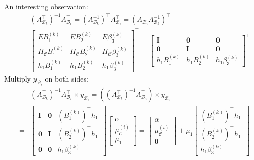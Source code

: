 \documentclass[letterpaper, 11pt]{article}
\theoremstyle{plain}
\theoremstyle{definition}
\begin{document}
An interesting observation:
\begin{eqnarray}
  & & (A_{\mathcal{B}_k}^\intercal)^{-1} A_{\mathcal{B}_i}^\intercal = (A_{\mathcal{B}_k}^{-1})^\intercal A_{\mathcal{B}_i}^\intercal = (A_{\mathcal{B}_i}A_{\mathcal{B}_k}^{-1})^\intercal  \nonumber \\
  &= &
  \begin{bmatrix}
    E B_1^{(k)} & E B_2^{(k)} & E \beta_3^{(k)} \\
    H_{\mathcal{C}} B_1^{(k)} & H_{\mathcal{C}} B_2^{(k)} & H_{\mathcal{C}} \beta_3^{(k)} \\
    h_1 B_1^{(k)} & h_1 B_2^{(k)} & h_1 \beta_3^{(k)}
  \end{bmatrix}^\intercal 
  = 
  \begin{bmatrix}
    \mathbf{I} & \mathbf{0} & \mathbf{0} \\
    \mathbf{0} & \mathbf{I} & \mathbf{0} \\
    h_1 B_1^{(k)} & h_1 B_2^{(k)} & h_1 \beta_3^{(k)}
  \end{bmatrix}^\intercal
\end{eqnarray}
Multiply $y_{\mathcal{B}_i}$ on both sides:
\begin{eqnarray}
& & (A_{\mathcal{B}_k}^\intercal)^{-1}A_{\mathcal{B}_i}^\intercal \times y_{\mathcal{B}_i} 
= ((A_{\mathcal{B}_k}^\intercal)^{-1}A_{\mathcal{B}_i}^\intercal) \times y_{\mathcal{B}_i} \nonumber \\
&=& \begin{bmatrix}
    \mathbf{I} & \mathbf{0} & (B_1^{(k)})^\intercal h_1^\intercal  \\
    \mathbf{0} & \mathbf{I} & (B_2^{(k)})^\intercal h_1^\intercal  \\
    \mathbf{0} & \mathbf{0} & h_1 \beta_3^{(k)}
  \end{bmatrix}
  \begin{bmatrix}
    \alpha \\
    \mu_{\mathcal{C}}^{(i)}  \\
    \mu_1
  \end{bmatrix} 
  = \begin{bmatrix}
    \alpha \\
    \mu_{\mathcal{C}}^{(i)} \\
    \mathbf{0}
  \end{bmatrix} + \mu_1
  \begin{bmatrix}
    (B_1^{(k)})^\intercal h_1^\intercal  \\
    (B_2^{(k)})^\intercal h_1^\intercal  \\
    h_1 \beta_3^{(k)}
  \end{bmatrix}
\end{eqnarray}
\end{document}
